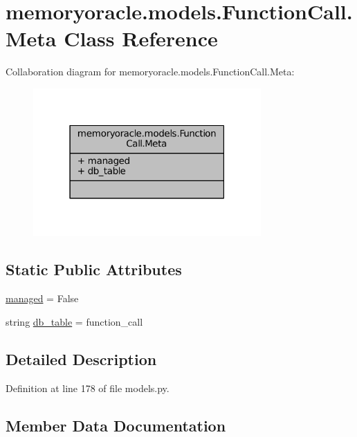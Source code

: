 \hypertarget{classmemoryoracle_1_1models_1_1FunctionCall_1_1Meta}{}\section{memoryoracle.\+models.\+Function\+Call.\+Meta Class Reference}
\label{classmemoryoracle_1_1models_1_1FunctionCall_1_1Meta}


Collaboration diagram for memoryoracle.\+models.\+Function\+Call.\+Meta\+:
\nopagebreak
\begin{figure}[H]
\begin{center}
\leavevmode
\includegraphics[width=247pt]{classmemoryoracle_1_1models_1_1FunctionCall_1_1Meta__coll__graph}
\end{center}
\end{figure}
\subsection*{Static Public Attributes}
\begin{DoxyCompactItemize}
\item 
\hyperlink{classmemoryoracle_1_1models_1_1FunctionCall_1_1Meta_a91bdd1050fa16ecafa081a12b5520e53}{managed} = False
\item 
string \hyperlink{classmemoryoracle_1_1models_1_1FunctionCall_1_1Meta_a21ce6fc41da9bb3e3459bc8f3a3155a9}{db\+\_\+table} = \textquotesingle{}function\+\_\+call\textquotesingle{}
\end{DoxyCompactItemize}


\subsection{Detailed Description}


Definition at line 178 of file models.\+py.



\subsection{Member Data Documentation}
\hypertarget{classmemoryoracle_1_1models_1_1FunctionCall_1_1Meta_a21ce6fc41da9bb3e3459bc8f3a3155a9}{}
